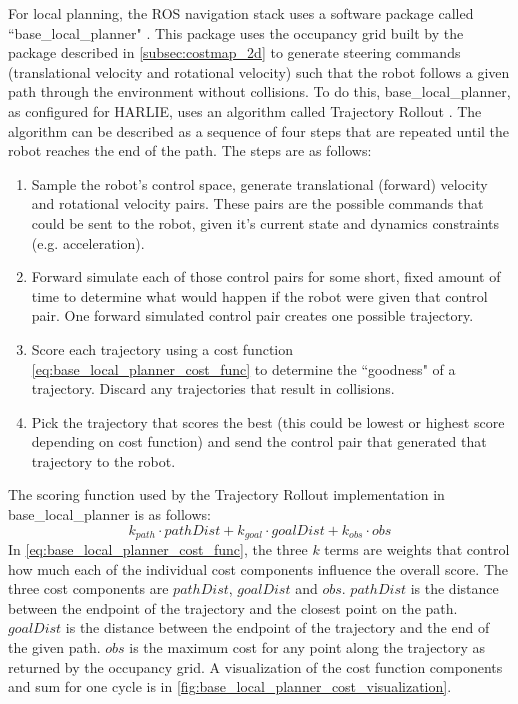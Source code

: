 For local planning, the ROS navigation stack uses a software package called ``base\_local\_planner" \autocite{BaseLocalPlannerWiki}. This package uses the occupancy grid built by the package described in \autoref{subsec:costmap_2d} to generate steering commands (translational velocity and rotational velocity) such that the robot follows a given path through the environment without collisions. To do this, base\_local\_planner, as configured for HARLIE, uses an algorithm called Trajectory Rollout \autocite{Gerkey_Konolige_2008}. The algorithm can be described as a sequence of four steps that are repeated until the robot reaches the end of the path. The steps are as follows:
\begin{enumerate}
\item Sample the robot's control space, generate translational (forward) velocity and rotational velocity pairs. These pairs are the possible commands that could be sent to the robot, given it's current state and dynamics constraints (e.g. acceleration).
\item Forward simulate each of those control pairs for some short, fixed amount of time to determine what would happen if the robot were given that control pair. One forward simulated control pair creates one possible trajectory.
\item Score each trajectory using a cost function \eqref{eq:base_local_planner_cost_func} to determine the ``goodness" of a trajectory. Discard any trajectories that result in collisions.
\item Pick the trajectory that scores the best (this could be lowest or highest score depending on cost function) and send the control pair that generated that trajectory to the robot.
\end{enumerate}

The scoring function used by the Trajectory Rollout implementation in base\_local\_planner is as follows:
\begin{equation}
	k_{path} \cdot pathDist + k_{goal} \cdot goalDist + k_{obs} \cdot obs \label{eq:base_local_planner_cost_func}
\end{equation}
In \eqref{eq:base_local_planner_cost_func}, the three $k$ terms are weights that control how much each of the individual cost components influence the overall score. The three cost components are $pathDist$, $goalDist$ and $obs$. $pathDist$ is the distance between the endpoint of the trajectory and the closest point on the path. $goalDist$ is the distance between the endpoint of the trajectory and the end of the given path. $obs$ is the maximum cost for any point along the trajectory as returned by the occupancy grid. A visualization of the cost function components and sum for one cycle is in \autoref{fig:base_local_planner_cost_visualization}.

